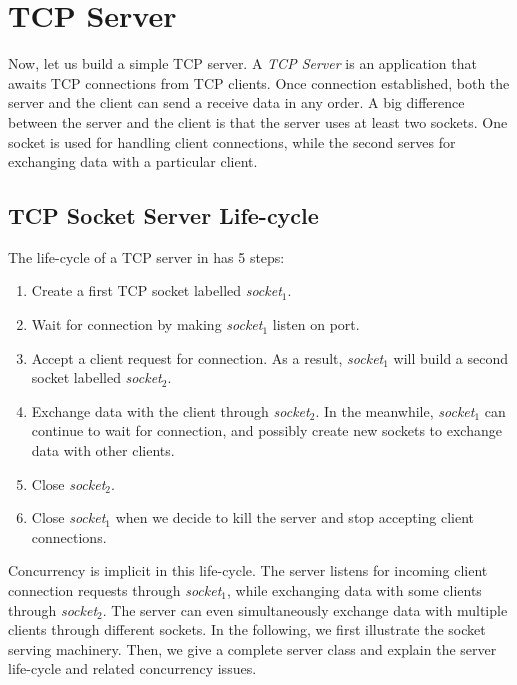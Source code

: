 \documentclass[a4paper,10pt,twoside]{book}
\begin{document}
\section{TCP Server}
\label{sec:serverTcpSocket}
Now, let us build a simple TCP server. A \textit{TCP Server} is an application that awaits TCP connections from TCP clients. Once connection established, both the server and the client can send a receive data in any order. 
A big difference between the server and the client is that the server uses at least two sockets.
One socket is used for handling client connections, while the second serves for exchanging data with a particular client. 

\subsection{TCP Socket Server Life-cycle}
The life-cycle of a TCP server in \pharo {}  has 5 steps:
\begin{enumerate}
\item Create a first TCP socket labelled \textit{socket$_1$}.
\item Wait for  connection by making \textit{socket$_1$}  listen on  port.
\item Accept a client request for connection. As a result, \textit{socket$_1$} will build a second socket labelled \textit{socket$_2$}.
\item Exchange data with the client through \textit{socket$_2$}. In the meanwhile, \textit{socket$_1$} can continue to wait for  connection, and possibly create new sockets to exchange data with other clients. 
\item Close \textit{socket$_2$}.
\item Close \textit{socket$_1$} when we decide to kill the server and stop accepting client connections.
\end{enumerate}

Concurrency is implicit in this life-cycle.
The server listens for incoming client connection requests through \textit{socket$_1$}, while exchanging data with some clients through \textit{socket$_2$}.
The server can even simultaneously exchange data with multiple clients through different sockets.
In the following, we first illustrate the socket serving machinery.
Then, we give a complete server class and explain the server life-cycle and related concurrency issues.
\end{document}
